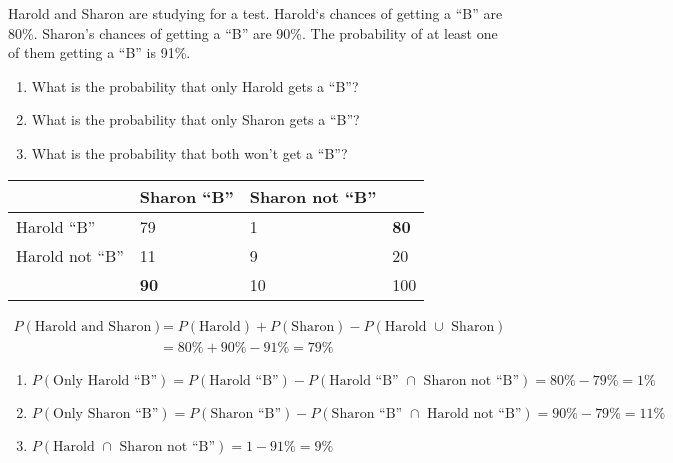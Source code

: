 \documentclass{homework}
\begin{document}
\newpage
\begin{problem}[2]
    Harold and Sharon are studying for a test. Harold`s chances of getting a ``B'' are 80\%. Sharon's chances of getting a ``B'' are 90\%. The probability of at least one of them getting a ``B'' is 91\%.

    \begin{enumerate}[label=\alph*.]
        \item What is the probability that only Harold gets a ``B''?
        \item What is the probability that only Sharon gets a ``B''?
        \item What is the probability that both won't get a ``B''?
    \end{enumerate}
\end{problem}

\begin{solution}
    \begin{table}[h]
        \centering
        
        \begin{tabular}{@{}l|l|l|l@{}}
        & Sharon ``B'' & Sharon not ``B'' & \\
        \midrule
        Harold ``B'' & 79 & 1 & \textbf{80} \\
        Harold not ``B'' & 11 & 9 & 20 \\
        \midrule
        & \textbf{90} & 10 & 100
        \end{tabular}
    \end{table}
    
    $$
    \begin{aligned}
    P(\text{Harold and Sharon}) & = P(\text{Harold}) + P(\text{Sharon}) - P(\text{Harold $\cup$ Sharon}) \\
    & = 80 \% + 90 \% - 91 \% = 79 \%
    \end{aligned}
    $$

    \begin{enumerate}[label=\alph*.]
        \item $P(\text{Only Harold ``B''}) = P(\text{Harold ``B''}) - P(\text{Harold ``B'' $\cap$ Sharon not ``B''}) = 80 \% - 79 \% = 1 \%$
        \item $P(\text{Only Sharon ``B''}) = P(\text{Sharon ``B''}) - P(\text{Sharon ``B'' $\cap$ Harold not ``B''}) = 90 \% - 79 \% = 11\%$
        \item $P(\text{Harold $\cap$ Sharon not ``B''}) = 1 - 91\% = 9 \%$
    \end{enumerate}

\end{solution}
\end{document}
